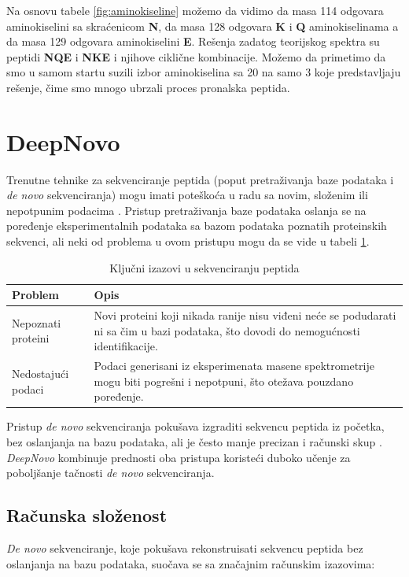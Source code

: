 \documentclass[12pt,oneside]{memoir}
\begin{document}
Na osnovu tabele \ref{fig:aminokiseline} možemo da vidimo da masa 114 odgovara aminokiselini sa skraćenicom \textbf{N}, da masa 128 odgovara \textbf{K} i \textbf{Q} aminokiselinama a da masa 129 odgovara aminokiselini \textbf{E}.
Rešenja zadatog teorijskog spektra su peptidi \textbf{NQE} i \textbf{NKE} i njihove ciklične kombinacije. Možemo da primetimo da smo u samom startu suzili izbor aminokiselina sa 20 na samo 3 koje predstavljaju rešenje, čime smo mnogo ubrzali proces pronalska peptida.

\section{DeepNovo}

Trenutne tehnike za sekvenciranje peptida (poput pretraživanja baze podataka i \emph{de novo} sekvenciranja) mogu imati poteškoća u radu sa novim, složenim ili nepotpunim podacima \cite{deepnovo}. Pristup pretraživanja baze podataka oslanja se na poređenje eksperimentalnih podataka sa bazom podataka poznatih proteinskih sekvenci, ali neki od problema u ovom pristupu mogu da se vide u tabeli \ref{tab:limitation}.

\begin{table}[h]
\centering
\begin{tabularx}{\linewidth}{lX}
\toprule
\textbf{Problem} & \textbf{Opis} \\
\midrule
Nepoznati proteini & Novi proteini koji nikada ranije nisu viđeni neće se podudarati ni sa čim u bazi podataka, što dovodi do nemogućnosti identifikacije. \\
Nedostajući podaci & Podaci generisani iz eksperimenata masene spektrometrije mogu biti pogrešni i nepotpuni, što otežava pouzdano poređenje. \\
\bottomrule
\end{tabularx}
\caption{Ključni izazovi u sekvenciranju peptida}
\label{tab:limitation}
\end{table}

Pristup \emph{de novo} sekvenciranja pokušava izgraditi sekvencu peptida iz početka, bez oslanjanja na bazu podataka, ali je često manje precizan i računski skup \cite{deepnovo}. \emph{DeepNovo} kombinuje prednosti oba pristupa koristeći duboko učenje za poboljšanje tačnosti \emph{de novo} sekvenciranja.

\subsection{Računska složenost}
\emph{De novo} sekvenciranje, koje pokušava rekonstruisati sekvencu peptida bez oslanjanja na bazu podataka, suočava se sa značajnim računskim izazovima:
\end{document}
